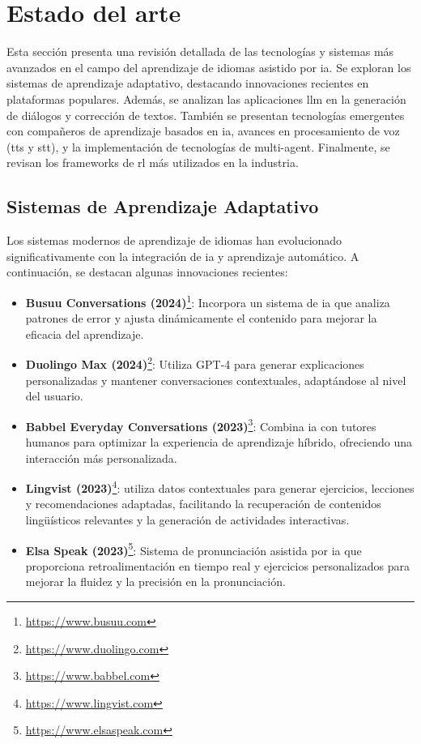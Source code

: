 \chapter{Estado del arte}
\label{estado-del-arte}

Esta sección presenta una revisión detallada de las tecnologías y sistemas más avanzados en el campo del aprendizaje de idiomas asistido por \gls{ia}. Se exploran los sistemas de aprendizaje adaptativo, destacando innovaciones recientes en plataformas populares. Además, se analizan las aplicaciones \gls{llm} en la generación de diálogos y corrección de textos. También se presentan tecnologías emergentes con compañeros de aprendizaje basados en \gls{ia}, avances en procesamiento de voz (\gls{tts} y \gls{stt}), y la implementación de tecnologías de \gls{multi-agent}. Finalmente, se revisan los frameworks de \gls{rl} más utilizados en la industria.

\section{Sistemas de Aprendizaje Adaptativo}

Los sistemas modernos de aprendizaje de idiomas han evolucionado significativamente con la integración de \gls{ia} y aprendizaje automático. A continuación, se destacan algunas innovaciones recientes:

\begin{itemize}
  \item \textbf{Busuu Conversations (2024)}\footnote{\url{https://www.busuu.com}}: Incorpora un sistema de \gls{ia} que analiza patrones de error y ajusta dinámicamente el contenido para mejorar la eficacia del aprendizaje.
  \item \textbf{Duolingo Max (2024)}\footnote{\url{https://www.duolingo.com}}: Utiliza GPT-4 para generar explicaciones personalizadas y mantener conversaciones contextuales, adaptándose al nivel del usuario.
  \item \textbf{Babbel Everyday Conversations (2023)}\footnote{\url{https://www.babbel.com}}: Combina \gls{ia} con tutores humanos para optimizar la experiencia de aprendizaje híbrido, ofreciendo una interacción más personalizada.
  \item \textbf{Lingvist (2023)}\footnote{\url{https://www.lingvist.com}}: utiliza datos contextuales para generar ejercicios, lecciones y recomendaciones adaptadas, facilitando la recuperación de contenidos lingüísticos relevantes y la generación de actividades interactivas.
  \item \textbf{Elsa Speak (2023)}\footnote{\url{https://www.elsaspeak.com}}: Sistema de pronunciación asistida por \gls{ia} que proporciona retroalimentación en tiempo real y ejercicios personalizados para mejorar la fluidez y la precisión en la pronunciación.
\end{itemize}

